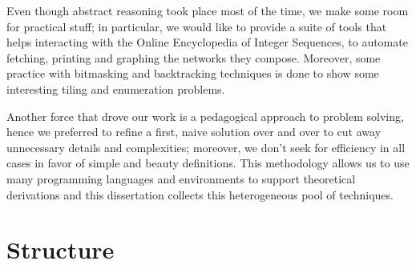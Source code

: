 Even though abstract reasoning took place most of the time, we make
some room for practical stuff; in particular, we would like to provide a suite
of tools that helps interacting with the Online Encyclopedia of Integer
Sequences, to automate fetching, printing and graphing the networks they
compose. Moreover, some practice with bitmasking and backtracking techniques is
done to show some interesting tiling and enumeration problems.

Another force that drove our work is a pedagogical approach to problem solving,
hence we preferred to refine a first, naive solution over and over to cut away
unnecessary details and complexities; moreover, we don't seek for efficiency in
all cases in favor of simple and beauty definitions. This methodology allows us
to use many programming languages and environments to support theoretical
derivations and this dissertation collects this heterogeneous pool of techniques.


\section*{Structure}

